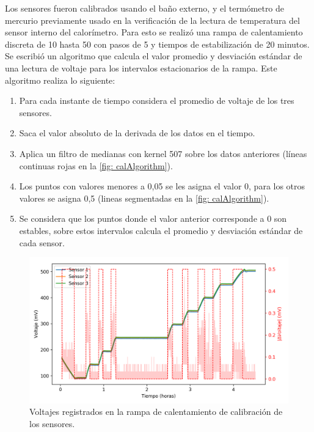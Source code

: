 	Los sensores fueron calibrados usando el baño externo, y el termómetro de mercurio previamente usado en la verificación de la lectura de temperatura del sensor interno del calorímetro. Para esto se realizó una rampa de calentamiento discreta de 10 \grad{} hasta 50 \grad{} con pasos de 5 \grad{} y tiempos de estabilización de 20 minutos. Se escribió un algoritmo que calcula el valor promedio y desviación estándar de una lectura de voltaje para los intervalos estacionarios de la rampa. Este algoritmo realiza lo siguiente:
	\begin{enumerate}
		\item Para cada instante de tiempo considera el promedio de voltaje de los tres sensores.
		\item Saca el valor absoluto de la derivada de los datos en el tiempo.
		\item Aplica un filtro de medianas con kernel 507 sobre los datos anteriores (líneas continuas rojas en la \autoref{fig: calAlgorithm}).
		\item Los puntos con valores menores a 0,05 se les asigna el valor 0, para los otros valores se asigna 0,5 (lineas segmentadas en la \autoref{fig: calAlgorithm}).
		\item Se considera que los puntos donde el valor anterior corresponde a 0 son estables, sobre estos intervalos calcula el promedio y desviación estándar de cada sensor.
	\end{enumerate}
	
	\begin{figure}[h]
		\centering
		\includegraphics[width=\linewidth]{../Data/TemperatureCalibration/dV-t}
		\caption{Voltajes registrados en la rampa de calentamiento de calibración de los sensores.}
		\label{fig: calAlgorithm}
	\end{figure}

